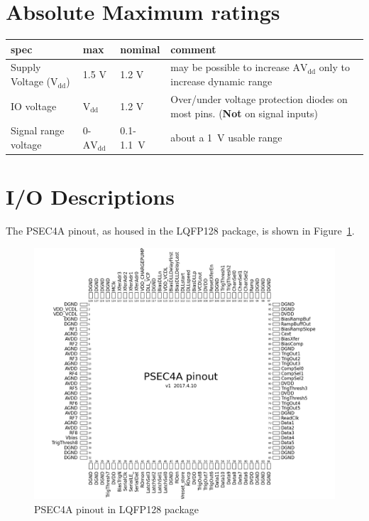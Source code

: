 \documentclass[12pt]{article}
\begin{document}
\section*{Absolute Maximum ratings}
\begin{center}
\begin{tabular}[b!]{l|p{1.4cm}|p{1.7cm}|p{9cm}}
  \hline
   spec       & max & nominal & comment \\ \hline
   Supply Voltage ($\mathrm{V_{dd}}$) &  1.5 V  & 1.2 V  &   may be possible to increase $\mathrm{AV_{dd}}$ only to increase dynamic range\\ \hline
   IO voltage &  $\mathrm{V_{dd}}$ & 1.2 V & Over/under voltage protection diodes on most pins. ({\bf Not} on signal inputs) \\ \hline
   Signal range voltage & 0-$\mathrm{AV_{dd}}$ & 0.1-1.1~V & about a 1~V usable range

\end{tabular}
\end{center}

\newpage
\section*{I/O Descriptions}
The PSEC4A pinout, as housed in the LQFP128 package, is shown in Figure~\ref{fig:pinout}.

\begin{figure}[t!]
    \begin{center}
      \includegraphics[width=18.3cm]{fig/PSEC4a_pinout_LQFP128.png}

    \end{center}
    \caption{PSEC4A pinout in LQFP128 package}
    \label{fig:pinout}
\end{figure}
\end{document}
